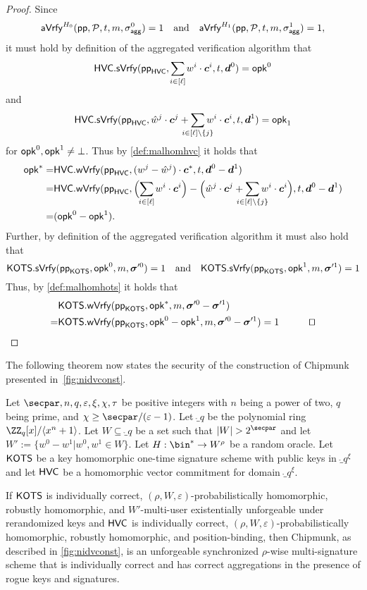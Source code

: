 \begin{proof}
    Since 
    \[
    \mathsf{aVrfy}^{H_0}(\mathsf{pp},\mathcal{P},t,m,\sigma_\mathsf{agg}^0)=1 \quad \text{and} \quad \mathsf{aVrfy}^{H_1}(\mathsf{pp},\mathcal{P},t,m,\sigma_\mathsf{agg}^1)=1,
    \]
    it must hold by definition of the aggregated verification algorithm that 
    \[
      \hvc.\sverify(\hvcparams,\smashoperator{\sum_{i\in[\ell]}} w^i\cdot \vec{c}^i,t,\vec{d}^0) = \opk^0 
    \]
    and
    \[   
      \hvc.\sverify(\hvcparams,\hat{w}^j\cdot \vec{c}^j+\smashoperator{\sum_{i\in[\ell]\setminus\{j\}}} w^i\cdot \vec{c}^i,t,\vec{d}^1)= \opk_1
    \]
    for $\mathsf{opk}^0,\mathsf{opk}^1\neq\bot$.
    Thus by \autoref{def:malhomhvc} it holds that
    \begin{align*}
      \opk^* =& \hvc.\wverify(\hvcparams,(w^j-\hat{w}^j)\cdot \vec{c}^*,t,\vec{d}^0-\vec{d}^1)\\
      =&\hvc.\wverify(\hvcparams,\Bigl(\smashoperator{\sum_{i\in[\ell]}} w^i\cdot \vec{c}^i\Bigr) - \Bigl(\hat{w}^j\cdot \vec{c}^j+\smashoperator{\sum_{i\in[\ell]\setminus\{j\}}} w^i\cdot \vec{c}^i\Bigr),t,\vec{d}^0-\vec{d}^1)\\
       =& (\opk^0-\opk^1).
    \end{align*}
    Further, by definition of the aggregated verification algorithm it must also hold that
    \[
      \mathsf{KOTS}.\mathsf{sVrfy}(\mathsf{pp}_{\mathsf{KOTS}},\mathsf{opk}^0,m,\boldsymbol{\sigma}'^0) =1 \quad \text{and} \quad \mathsf{KOTS}.\mathsf{sVrfy}(\mathsf{pp}_{\mathsf{KOTS}},\mathsf{opk}^1,m,\boldsymbol{\sigma}'^1)=1
    \]
    Thus, by \autoref{def:malhomhots} it holds that
    \begin{align*}
      &\hots.\wverify(\hotsparams,\opk^*,m,\otsig^0-\otsig^1)\\
      =&\hots.\wverify(\hotsparams,\opk^0-\opk^1,m,\otsig^0-\otsig^1)=1 \tag*{\qed}
    \end{align*}
\end{proof}
\fi
The following theorem now states the security of the construction of Chipmunk presented in~\autoref{fig:nidvconst}.
\begin{theorem}\label{thm:mainconstruction}
Let $\secpar,n,q,\varepsilon,\xi,\chi,\tau$ be positive integers with $n$ being a power of two, $q$ being prime, and $\chi \geq \secpar/(\varepsilon-1)$.
Let $\ring_q$ be the polynomial ring $\ZZ_q[x]/\langle x^n+1\rangle$.
Let $W \subseteq \ring_q$ be a set such that $|W| > 2^\secpar$ and let $W' := \{w^0-w^1| w^0,w^1 \in W\}$.
Let $H : \bin^* \to W^\rho$ be a random oracle.
Let $\mathsf{KOTS}$ be a key homomorphic one-time signature scheme with public keys in $\ring_q^\xi$ and let $\mathsf{HVC}$ be a homomorphic vector commitment for domain $\ring_q^\xi$.

If $\mathsf{KOTS}$ is individually correct, $(\rho,W,\varepsilon)$-probabilistically homomorphic, robustly homomorphic, and $W'$-multi-user existentially unforgeable under rerandomized keys and $\mathsf{HVC}$ is individually correct, $(\rho,W,\varepsilon)$-probabilistically homomorphic, robustly homomorphic, and position-binding, then Chipmunk, as described in \autoref{fig:nidvconst}, is an unforgeable synchronized $\rho$-wise multi-signature scheme that is individually correct and has correct aggregations in the presence of rogue keys and signatures.
\end{theorem}


